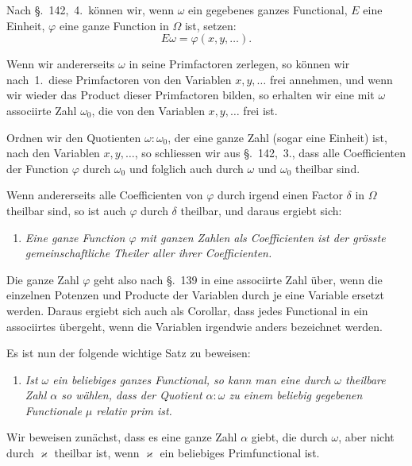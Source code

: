 \documentclass[12pt,a4paper]{article}
\theoremstyle{definition}
\begin{document}
\newpage

Nach \S.~142,~4.\ können wir, wenn $\omega$ ein gegebenes ganzes Functional, $E$ eine Einheit, $\varphi$ eine ganze Function in $\Omega$ ist, setzen:
\begin{equation}\label{eq:143-1}
E\omega = \varphi(x,y,\dots).
\end{equation}

Wenn wir andererseits $\omega$ in seine Primfactoren zerlegen, so können wir nach~1.\ diese Primfactoren von den Variablen $x,y,\dots$ frei annehmen, und wenn wir wieder das Product dieser Primfactoren bilden, so erhalten wir eine mit $\omega$ associirte Zahl $\omega_0$, die von den Variablen $x,y,\dots$ frei ist.

Ordnen wir den Quotienten $\omega:\omega_0$, der eine ganze Zahl (sogar eine Einheit) ist, nach den Variablen $x,y,\dots$, so schliessen wir aus \S.~142,~3., dass alle Coefficienten der Function $\varphi$ durch $\omega_0$ und folglich auch durch $\omega$ und $\omega_0$ theilbar sind.

Wenn andererseits alle Coefficienten von $\varphi$ durch irgend einen Factor $\delta$ in $\Omega$ theilbar sind, so ist auch $\varphi$ durch $\delta$ theilbar, und daraus ergiebt sich:

\begin{enumerate}[label=\arabic*., resume]
\item \textit{Eine ganze Function $\varphi$ mit ganzen Zahlen als Coefficienten ist der grösste gemeinschaftliche Theiler aller ihrer Coefficienten.}
\end{enumerate}

Die ganze Zahl $\varphi$ geht also nach \S.~139 in eine associirte Zahl über, wenn die einzelnen Potenzen und Producte der Variablen durch je eine Variable ersetzt werden. Daraus ergiebt sich auch als Corollar, dass jedes Functional in ein associirtes übergeht, wenn die Variablen irgendwie anders bezeichnet werden.

Es ist nun der folgende wichtige Satz zu beweisen:

\begin{enumerate}[label=\arabic*., resume]
\item \textit{Ist $\omega$ ein beliebiges ganzes Functional, so kann man eine durch $\omega$ theilbare Zahl $\alpha$ so wählen, dass der Quotient $\alpha:\omega$ zu einem beliebig gegebenen Functionale $\mu$ relativ prim ist.}
\end{enumerate}

Wir beweisen zunächst, dass es eine ganze Zahl $\alpha$ giebt, die durch $\omega$, aber nicht durch $\varkappa$ theilbar ist, wenn $\varkappa$ ein beliebiges Primfunctional ist.
\end{document}
